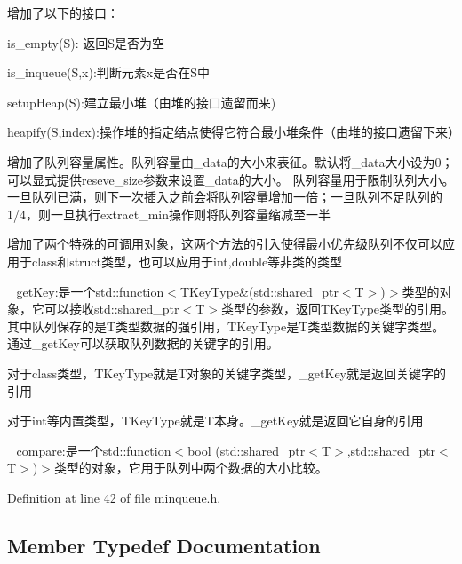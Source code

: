 \begin{DoxyItemize}
\item 增加了以下的接口：
\begin{DoxyItemize}
\item is\+\_\+empty(\+S)\+: 返回\+S是否为空
\item is\+\_\+inqueue(\+S,x)\+:判断元素x是否在\+S中
\item setup\+Heap(\+S)\+:建立最小堆（由堆的接口遗留而来)
\item heapify(\+S,index)\+:操作堆的指定结点使得它符合最小堆条件（由堆的接口遗留下来）
\end{DoxyItemize}
\item 增加了队列容量属性。队列容量由{\ttfamily \+\_\+data}的大小来表征。默认将{\ttfamily \+\_\+data}大小设为0；可以显式提供{\ttfamily reseve\+\_\+size}参数来设置{\ttfamily \+\_\+data}的大小。 队列容量用于限制队列大小。一旦队列已满，则下一次插入之前会将队列容量增加一倍；一旦队列不足队列的1/4，则一旦执行{\ttfamily extract\+\_\+min}操作则将队列容量缩减至一半
\item 增加了两个特殊的可调用对象，这两个方法的引入使得最小优先级队列不仅可以应用于class和struct类型，也可以应用于int,double等非类的类型
\begin{DoxyItemize}
\item \+\_\+get\+Key\+:是一个std\+:\+:function$<$T\+Key\+Type\&(std\+::shared\+\_\+ptr$<$\+T$>$)$>$类型的对象，它可以接收std\+::shared\+\_\+ptr$<$\+T$>$类型的参数，返回\+T\+Key\+Type类型的引用。 其中队列保存的是\+T类型数据的强引用，\+T\+Key\+Type是\+T类型数据的关键字类型。通过\+\_\+get\+Key可以获取队列数据的关键字的引用。
\begin{DoxyItemize}
\item 对于class类型，\+T\+Key\+Type就是\+T对象的关键字类型，\+\_\+get\+Key就是返回关键字的引用
\item 对于int等内置类型，\+T\+Key\+Type就是\+T本身。\+\_\+get\+Key就是返回它自身的引用
\end{DoxyItemize}
\item \+\_\+compare\+:是一个std\+:\+:function$<$bool (std\+::shared\+\_\+ptr$<$\+T$>$,std\+::shared\+\_\+ptr$<$\+T$>$)$>$类型的对象，它用于队列中两个数据的大小比较。 
\end{DoxyItemize}
\end{DoxyItemize}

Definition at line 42 of file minqueue.\+h.



\subsection{Member Typedef Documentation}
\hypertarget{class_introduction_to_algorithm_1_1_queue_algorithm_1_1_min_queue_a8f2f5b5d2b7097bbc6edda7b9c9228a6}{}
